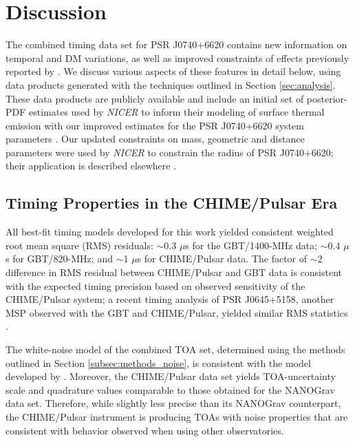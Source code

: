\documentclass[twocolumn]{aastex63}
\newcommand{\us}{$\mu$s}
\newcommand{\nicer}{{\it NICER}}
\newcommand{\chimepsr}{CHIME/Pulsar}
\begin{document}
\section{Discussion}
\label{sec:discussion}

The combined timing data set for PSR J0740+6620 contains new information on temporal and DM variations, as well as improved constraints of effects previously reported by \citet{cfr+20}. We discuss various aspects of these features in detail below, using data products generated with the techniques outlined in Section \ref{sec:analysis}. These data products are publicly available and include an initial set of posterior-PDF estimates used by \nicer{} to inform their modeling of surface thermal emission with our improved estimates for the PSR J0740+6620 system parameters \citep{zen21}. Our updated constraints on mass, geometric and distance parameters were used by \nicer{} to constrain the radius of PSR J0740+6620; their application is described elsewhere \citep{mld+21,rwr+21,raj+21}.

\subsection{Timing Properties in the \chimepsr{} Era}
All best-fit timing models developed for this work yielded consistent weighted root mean square (RMS) residuals: $\sim$0.3 \us{} for the GBT/1400-MHz data; $\sim$0.4 \us{} for GBT/820-MHz; and $\sim$1 \us{} for \chimepsr{} data. The factor of $\sim$2 difference in RMS residual between \chimepsr{} and GBT data is consistent with the expected timing precision based on observed sensitivity of the \chimepsr{} system; a recent timing analysis of PSR J0645$+$5158, another MSP observed with the GBT and \chimepsr{}, yielded similar RMS statistics \citep{abb+20}. 

The white-noise model of the combined TOA set, determined using the methods outlined in Section \ref{subsec:methods_noise}, is consistent with the model developed by \citet{cfr+20}. Moreover, the \chimepsr{} data set yields TOA-uncertainty scale and quadrature values comparable to those obtained for the NANOGrav data set. Therefore, while slightly less precise than its NANOGrav counterpart, the \chimepsr{} instrument is producing TOAs with noise properties that are consistent with behavior observed when using other observatories.
\end{document}
